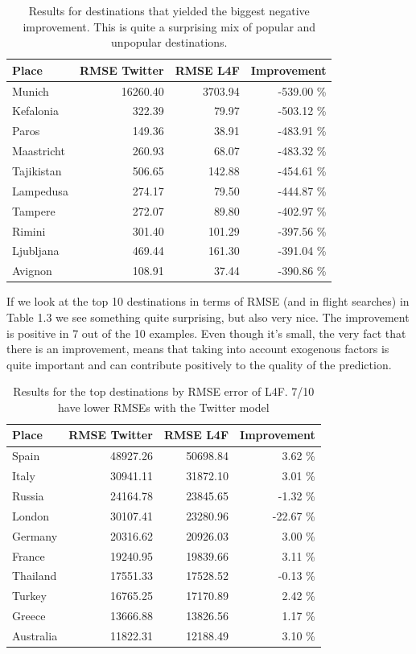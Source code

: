 \documentclass[minf,frontabs,twoside,singlespacing,parskip]{infthesis}
\begin{document}
\begin{table}[h]
\begin{center}
\begin{tabular}{ l | r | r | r}
Place & RMSE Twitter & RMSE L4F & Improvement \\
\hline
Munich & 16260.40 & 3703.94 & -539.00 \% \\
Kefalonia & 322.39 & 79.97 & -503.12 \% \\
Paros & 149.36 & 38.91 & -483.91 \% \\
Maastricht & 260.93 & 68.07 & -483.32 \% \\
Tajikistan & 506.65 & 142.88 & -454.61 \% \\
Lampedusa & 274.17 & 79.50 & -444.87 \% \\
Tampere & 272.07 & 89.80 & -402.97 \% \\
Rimini & 301.40 & 101.29 & -397.56 \% \\
Ljubljana & 469.44 & 161.30 & -391.04 \% \\
Avignon & 108.91 & 37.44 & -390.86 \% \\
\end{tabular}
\end{center}
\caption{Results for destinations that yielded the biggest negative improvement. This is quite a surprising mix of popular and unpopular destinations. }
\end{table}


If we look at the top 10 destinations in terms of RMSE (and in flight searches) in Table 1.3 we see something quite surprising, but also very nice. The improvement is positive in 7 out of the 10 examples. Even though it's small, the very fact that there is an improvement, means that taking into account exogenous factors is quite important and can contribute positively to the quality of the prediction.

\begin{table}[h]
\begin{center}
\begin{tabular}{ l | r | r | r}
Place & RMSE Twitter & RMSE L4F & Improvement \\
\hline
Spain & 48927.26 & 50698.84 & 3.62 \% \\ 
Italy & 30941.11 & 31872.10 & 3.01 \% \\ 
Russia & 24164.78 & 23845.65 & -1.32 \% \\ 
London & 30107.41 & 23280.96 & -22.67 \% \\ 
Germany & 20316.62 & 20926.03 & 3.00 \% \\ 
France & 19240.95 & 19839.66 & 3.11 \% \\ 
Thailand & 17551.33 & 17528.52 & -0.13 \% \\ 
Turkey & 16765.25 & 17170.89 & 2.42 \% \\ 
Greece & 13666.88 & 13826.56 & 1.17 \% \\ 
Australia & 11822.31 & 12188.49 & 3.10 \% \\
\end{tabular}
\end{center}
\caption{Results for the top destinations by RMSE error of L4F. 7/10 have lower RMSEs with the Twitter model}
\end{table}
\end{document}
